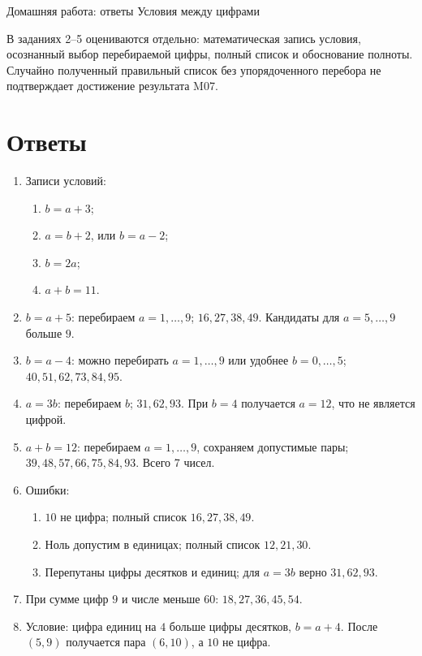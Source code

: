 \worksheettitle
  {Домашняя работа: ответы}
  { Условия между цифрами}

\begin{teacherbox}
  В заданиях 2--5 оцениваются отдельно: математическая запись условия,
  осознанный выбор перебираемой цифры, полный список и обоснование полноты.
  Случайно полученный правильный список без упорядоченного перебора не
  подтверждает достижение результата M07.
\end{teacherbox}

\section{Ответы}

\begin{enumerate}
  \item Записи условий:
    \begin{enumerate}
      \item \(b=a+3\);
      \item \(a=b+2\), или \(b=a-2\);
      \item \(b=2a\);
      \item \(a+b=11\).
    \end{enumerate}
  \item \(b=a+5\): перебираем \(a=1,\ldots,9\); \(16,27,38,49\).
    Кандидаты для \(a=5,\ldots,9\) больше \(9\).
  \item \(b=a-4\): можно перебирать \(a=1,\ldots,9\) или удобнее
    \(b=0,\ldots,5\); \(40,51,62,73,84,95\).
  \item \(a=3b\): перебираем \(b\); \(31,62,93\). При \(b=4\)
    получается \(a=12\), что не является цифрой.
  \item \(a+b=12\): перебираем \(a=1,\ldots,9\), сохраняем допустимые пары;
    \(39,48,57,66,75,84,93\). Всего 7 чисел.
  \item Ошибки:
    \begin{enumerate}
      \item \(10\) не цифра; полный список \(16,27,38,49\).
      \item Ноль допустим в единицах; полный список \(12,21,30\).
      \item Перепутаны цифры десятков и единиц; для \(a=3b\) верно
        \(31,62,93\).
    \end{enumerate}
  \item При сумме цифр \(9\) и числе меньше \(60\): \(18,27,36,45,54\).
  \item Условие: цифра единиц на \(4\) больше цифры десятков, \(b=a+4\).
    После \((5,9)\) получается пара \((6,10)\), а \(10\) не цифра.
\end{enumerate}

